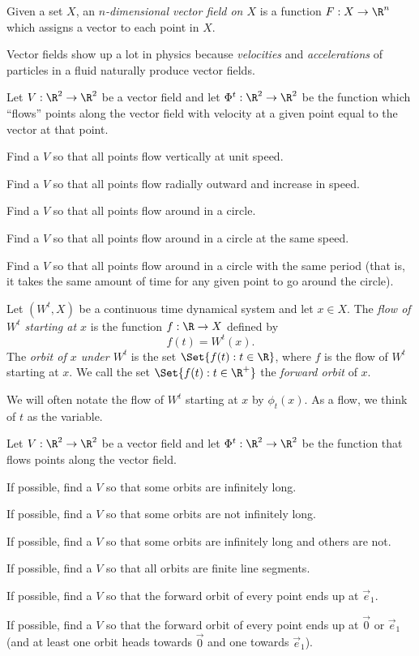 	\newpage
	\begin{definition}
		Given a set $X$, an \emph{$n$-dimensional vector field on $X$} is a function $F:X\to \R^n$ which
		assigns a vector to each point in $X$.
	\end{definition}

	Vector fields show up a lot in physics because \emph{velocities} and \emph{accelerations} of particles in a fluid
	naturally produce vector fields.

	\question
		Let $V:\R^2\to\R^2$ be a vector field and let $\Phi^t:\R^2\to\R^2$ be the function which ``flows'' points along
		the vector field with velocity at a given point equal to the vector at that point.
	\begin{parts}
		\item Find a $V$ so that all points flow vertically at unit speed.
		\item Find a $V$ so that all points flow radially outward and increase in speed.
		\item Find a $V$ so that all points flow around in a circle.
		\item Find a $V$ so that all points flow around in a circle at the same speed.
		\item Find a $V$ so that all points flow around in a circle with the same period (that is, it takes the same
			amount of time for any given point to go around the circle).
	\end{parts}

	\begin{definition}
		Let $(W^t,X)$ be a continuous time dynamical system and let $x\in X$. 
		The \emph{flow of $W^t$ starting at $x$} is the function $f:\R\to X$ defined by
		\[
			f(t) = W^t(x).
		\]
		The \emph{orbit of $x$ under $W^t$} is the set $\Set{f(t):t\in \R}$, where $f$ is the flow of $W^t$
		starting at $x$. We call the set $\Set{f(t):t\in \R^+}$ the \emph{forward orbit} of $x$.
	\end{definition}
	We will often notate the flow of $W^t$ starting at $x$ by $\phi_t(x)$. As a flow, we think of $t$ as the variable.

	\question
		Let $V:\R^2\to\R^2$ be a vector field and let $\Phi^t:\R^2\to\R^2$ be the function that flows
		points along the vector field. 
	\begin{parts}
		\item If possible, find a $V$ so that some orbits are infinitely long.
		\item If possible, find a $V$ so that some orbits are not infinitely long.
		\item If possible, find a $V$ so that some orbits are infinitely long and others are not.
		\item If possible, find a $V$ so that all orbits are finite line segments.
		\item If possible, find a $V$ so that the forward orbit of every point ends up at $\vec e_1$.
		\item If possible, find a $V$ so that the forward orbit of every point ends up at $\vec 0$ or $\vec e_1$ (and
			at least one orbit heads towards $\vec 0$ and one towards $\vec e_1$).
	\end{parts}

